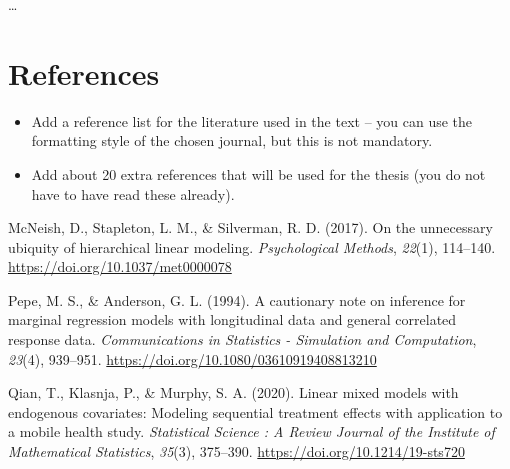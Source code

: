 \documentclass[
  12pt,
  a4paper,
]{article}
\providecommand{\tightlist}{%
  \setlength{\itemsep}{0pt}\setlength{\parskip}{0pt}}\usepackage{longtable,booktabs,array}
\newlength{\cslhangindent}
\newlength{\cslentryspacingunit} %
\newenvironment{CSLReferences}[2] %
 {%
  \setlength{\parindent}{0pt}
  \ifodd #1
  \let\oldpar\par
  \def\par{\hangindent=\cslhangindent\oldpar}
  \fi
  \setlength{\parskip}{#2\cslentryspacingunit}
 }%
 {}
\begin{document}
\ldots{}

\newpage

\hypertarget{references}{%
\section{References}\label{references}}

\begin{itemize}
\tightlist
\item
  Add a reference list for the literature used in the text -- you can
  use the formatting style of the chosen journal, but this is not
  mandatory.
\item
  Add about 20 extra references that will be used for the thesis (you do
  not have to have read these already).
\end{itemize}

\hypertarget{refs}{}
\begin{CSLReferences}{1}{0}
\leavevmode{}%
McNeish, D., Stapleton, L. M., \& Silverman, R. D. (2017). On the
unnecessary ubiquity of hierarchical linear modeling.
\emph{Psychological Methods}, \emph{22}(1), 114--140.
\url{https://doi.org/10.1037/met0000078}

\leavevmode{}%
Pepe, M. S., \& Anderson, G. L. (1994). A cautionary note on inference
for marginal regression models with longitudinal data and general
correlated response data. \emph{Communications in Statistics -
Simulation and Computation}, \emph{23}(4), 939--951.
\url{https://doi.org/10.1080/03610919408813210}

\leavevmode{}%
Qian, T., Klasnja, P., \& Murphy, S. A. (2020). Linear mixed models with
endogenous covariates: Modeling sequential treatment effects with
application to a mobile health study. \emph{Statistical Science : A
Review Journal of the Institute of Mathematical Statistics},
\emph{35}(3), 375--390. \url{https://doi.org/10.1214/19-sts720}

\end{CSLReferences}
\end{document}
